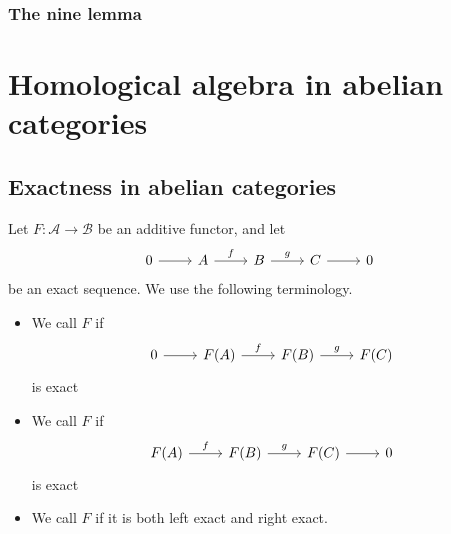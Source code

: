 \documentclass[main.tex]{subfiles}
\begin{document}
\begin{theorem}
  \label{thm:five_lemma}

\end{theorem}

\subsection{The nine lemma}
\label{ssc:the_nine_lemma}

\begin{theorem}
  \label{thm:nine_lemma}
\end{theorem}

\chapter{Homological algebra in abelian categories}
\label{ch:homological_algebra_in_abelian_categories}

\section{Exactness in abelian categories}
\label{sss:exactness_in_abelian_categories}

\begin{definition}
  \label{def:exact_functor}
  Let $F\colon \mathcal{A} \to \mathcal{B}$ be an additive functor, and let
  \begin{equation*}
    \begin{tikzcd}
      0
      \arrow[r]
      & A
      \arrow[r, "f"]
      & B
      \arrow[r, "g"]
      & C
      \arrow[r]
      & 0
    \end{tikzcd}
  \end{equation*}
  be an exact sequence. We use the following terminology.
  \begin{itemize}
    \item We call $F$  if
      \begin{equation*}
        \begin{tikzcd}
          0
          \arrow[r]
          & F(A)
          \arrow[r, "f"]
          & F(B)
          \arrow[r, "g"]
          & F(C)
        \end{tikzcd}
      \end{equation*}
      is exact

    \item We call $F$  if
      \begin{equation*}
        \begin{tikzcd}
          F(A)
          \arrow[r, "f"]
          & F(B)
          \arrow[r, "g"]
          & F(C)
          \arrow[r]
          & 0
        \end{tikzcd}
      \end{equation*}
      is exact

    \item We call $F$  if it is both left exact and right exact.
  \end{itemize}
\end{definition}
\end{document}

